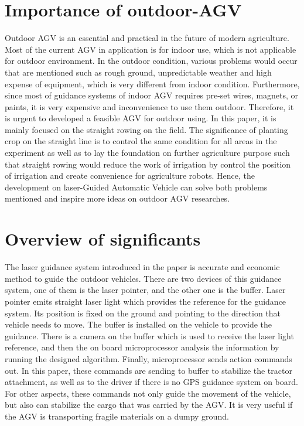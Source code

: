 \documentclass[letterpaper,12pt,oneside]{book}
\begin{document}
		\section{Importance of outdoor-AGV}
		Outdoor AGV is an essential and practical in the future of modern agriculture. Most of the current AGV in application is for indoor use, which is not applicable for outdoor environment. In the outdoor condition, various problems would occur that are mentioned such as rough ground, unpredictable weather and high expense of equipment, which is very different from indoor condition. Furthermore, since most of guidance systems of indoor AGV requires pre-set wires, magnets, or paints, it is very expensive and inconvenience to use them outdoor. Therefore, it is urgent to developed a feasible AGV for outdoor using. In this paper, it is mainly focused on the straight rowing on the field. The significance of planting crop on the straight line is to control the same condition for all areas in the experiment as well as to lay the foundation on further agriculture purpose such that straight rowing would reduce the work of irrigation by control the position of irrigation and create convenience for agriculture robots. Hence, the development on laser-Guided Automatic Vehicle can solve both problems mentioned and inspire more ideas on outdoor AGV researches.
		
		\section{Overview of significants}
		The laser guidance system introduced in the paper is accurate and economic method to guide the outdoor vehicles. There are two devices of this guidance system, one of them is the laser pointer, and the other one is the buffer. Laser pointer emits straight laser light which provides the reference for the guidance system. Its position is fixed on the ground and pointing to the direction that vehicle needs to move. The buffer is installed on the vehicle to provide the guidance. There is a camera on the buffer which is used to receive the laser light reference, and then the on board microprocessor analysis the information by running the designed algorithm. Finally, microprocessor sends action commands out. In this paper, these commands are sending to buffer to stabilize the tractor attachment, as well as to the driver if there is no GPS guidance system on board. For other aspects, these commands not only guide the movement of the vehicle, but also can stabilize the cargo that was carried by the AGV. It is very useful if the AGV is transporting fragile materials on a dumpy ground.
		
\end{document}
